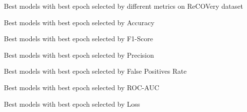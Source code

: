 \begin{table}[!htbp]
  \caption{Best models with best epoch selected by different metrics on ReCOVery dataset}
  \label{tab:recovery_best_models}
  \centering

  \begin{subtable}[t]{\linewidth}
    \footnotesize
    \caption{Best models with best epoch selected by Accuracy}
    
  \end{subtable}

  \vspace{1em}

  \begin{subtable}[t]{\linewidth}
    \footnotesize
    \caption{Best models with best epoch selected by F1-Score}
    
  \end{subtable}

  \vspace{1em}

  \begin{subtable}[t]{\linewidth}
    \footnotesize
    \caption{Best models with best epoch selected by Precision}
    
  \end{subtable}

    \vspace{1em}

\begin{subtable}[t]{\linewidth}
    \footnotesize
    \caption{Best models with best epoch selected by False Positives Rate}
    
  \end{subtable}

  \vspace{1em}

  \begin{subtable}[t]{\linewidth}
    \footnotesize
    \caption{Best models with best epoch selected by ROC-AUC}
    
  \end{subtable}

    \vspace{1em}

  \begin{subtable}[t]{\linewidth}
    \footnotesize
    \caption{Best models with best epoch selected by Loss}
    
  \end{subtable}

\end{table}